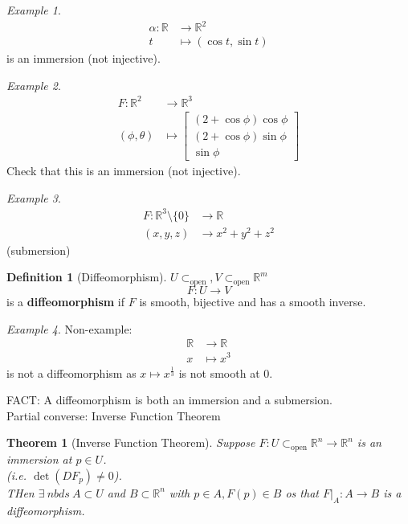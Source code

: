 \documentclass{article}
\newcommand{\R}{\mathbb{R}}
\newtheorem{theorem}{Theorem}[section]
\theoremstyle{definition}
\newtheorem{definition}{Definition}[section]
\theoremstyle{remark}
\theoremstyle{example}
\newtheorem*{example}{Example}
\begin{document}
	\begin{example}
		\begin{align*}
			\alpha:\R &\to \R^2\\
			t & \mapsto (\cos t, \sin t)
		\end{align*}
		is an immersion (not injective).
	\end{example}
	\begin{example}
		\begin{align*}
			F:\R^2 & \to \R^3\\
			(\phi, \theta) & \mapsto \begin{bmatrix}
				(2 + \cos \phi) \cos \phi\\
				(2 + \cos \phi) \sin \phi\\
				\sin \phi
			\end{bmatrix}
		\end{align*}
		Check that this is an immersion (not injective).
	\end{example}
	\begin{example}
		\begin{align*}
			F:\R^3 \setminus \{0\} & \to \R\\
			(x,y,z) & \to x^2+y^2+z^2
		\end{align*}
		(submersion)
	\end{example}

	\begin{definition}[Diffeomorphism]
		$U\subset_\mathrm{open}, V \subset_\mathrm{open}\R^m$\\
		\[F:U \to V\] is a \textbf{diffeomorphism} if $F$ is smooth, bijective and has a smooth inverse.
	\end{definition}
	\begin{example}
		Non-example: \begin{align*}
			\R & \to \R\\
			x & \mapsto x^3
		\end{align*}
		is not a diffeomorphism as $x \mapsto x^{\frac{1}{3}}$ is not smooth at 0.
	\end{example}

	FACT: A diffeomorphism is both an immersion and a submersion.\\
	Partial converse: Inverse Function Theorem
	\begin{theorem}[Inverse Function Theorem]
		Suppose $F:U \subset_\mathrm{open} \R^n \to \R^n$ is an immersion at $p \in U$.\\
		(i.e. $\det(DF_p) \neq 0$).\\
		THen $\exists \ nbds\ A \subset U$ and $B \subset \R^n$ with $p \in A, F(p) \in B$ os that $F |_A:A \to B$ is a diffeomorphism.
	\end{theorem}
\end{document}
